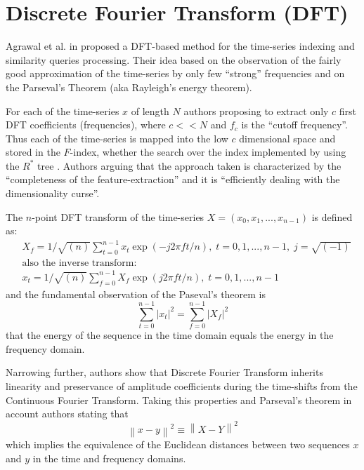 \section{Discrete Fourier Transform (DFT)}
Agrawal et al. in \cite{citeulike:3973409} proposed a DFT-based method for the time-series indexing and similarity queries processing. Their idea based on the observation of the fairly good approximation of the time-series by only few ``strong'' frequencies and on the Parseval's Theorem (aka Rayleigh's energy theorem). 

For each of the time-series $x$ of length $N$ authors proposing to extract only $c$ first DFT coefficients (frequencies), where $c<<N$ and $f_{c}$ is the ``cutoff frequency''. Thus each of the time-series is mapped into the low $c$ dimensional space and stored in the $F$-index, whether the search over the index implemented by using the $R^{*}$ tree \cite{citeulike:343069}. Authors arguing that the approach taken is characterized by the ``completeness of the feature-extraction'' and it is ``efficiently dealing with the dimensionality curse''. 

The $n$-point DFT transform of the time-series $X=(x_{0}, x_{1}, ... , x_{n-1})$ is defined as:
\begin{align}
& X_{f} = 1/\sqrt{(n)}\sum_{t=0}^{n-1} x_{t} \exp(-j2 \pi f t/n),\; t=0,1,...,n-1, \; j=\sqrt{(-1)} \\
& \text{also the inverse transform:} \nonumber \\
& x_{t} = 1/\sqrt{(n)}\sum_{f=0}^{n-1} X_{f} \exp(j2 \pi f t/n),\; t=0,1,...,n-1 
\end{align}
and the fundamental observation of the Paseval's theorem is
\begin{equation}
\sum_{t=0}^{n-1} \left| x_{t} \right| ^{2} = \sum_{f=0}^{n-1} \left| X_{f} \right| ^{2}
\label{eq:parseval}
\end{equation}
that the energy of the sequence in the time domain equals the energy in the frequency domain.

Narrowing further, authors show that Discrete Fourier Transform inherits linearity and preservance of amplitude coefficients during the time-shifts from the Continuous Fourier Transform. Taking this properties and Parseval's theorem in account authors stating that
\begin{equation}
\left\| x - y \right\| ^{2} \equiv \left\| X - Y \right\| ^{2}
\label{eq:dft_similarity}
\end{equation}
which implies the equivalence of the Euclidean distances between two sequences $x$ and $y$ in the time and frequency domains. 

